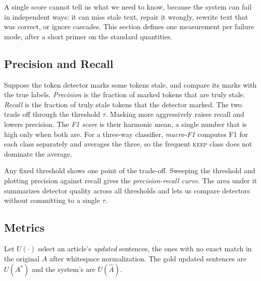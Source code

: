 \documentclass[]{paper}
\newcommand{\keep}{\textsc{keep}}
\begin{document}
A single score cannot tell us what we need to know, because the system can fail in independent ways: it can miss stale text, repair it wrongly, rewrite text that was correct, or ignore cascades. This section defines one measurement per failure mode, after a short primer on the standard quantities.

\subsection{Precision and Recall}
\label{sec:primer}

Suppose the token detector marks some tokens stale, and compare its marks with the true labels. \emph{Precision} is the fraction of marked tokens that are truly stale. \emph{Recall} is the fraction of truly stale tokens that the detector marked. The two trade off through the threshold $\tau$. Masking more aggressively raises recall and lowers precision. The \emph{F1 score} is their harmonic mean, a single number that is high only when both are. For a three-way classifier, \emph{macro-F1} computes F1 for each class separately and averages the three, so the frequent \keep{} class does not dominate the average.

Any fixed threshold shows one point of the trade-off. Sweeping the threshold and plotting precision against recall gives the \emph{precision-recall curve}. The area under it summarizes detector quality across all thresholds and lets us compare detectors without committing to a single $\tau$.

\subsection{Metrics}
\label{sec:metrics}

Let $U(\cdot)$ select an article's \emph{updated} sentences, the ones with no exact match in the original $A$ after whitespace normalization. The gold updated sentences are $U(A^\ast)$ and the system's are $U(\hat{A})$.
\end{document}

